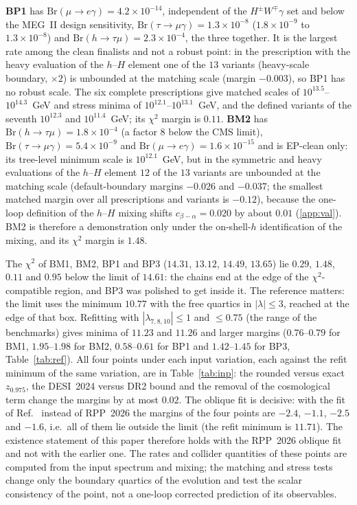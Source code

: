 \documentclass[twocolumn,epjc3]{svjour3}
\newcommand{\Br}{\mathrm{Br}}
\begin{document}
\textbf{BP1} has $\Br(\mu\to e\gamma)=4.2\times10^{-14}$, independent of the $H^\pm W^\mp\gamma$ set and below the MEG~II design sensitivity, $\Br(\tau\to\mu\gamma)=1.3\times10^{-8}$ ($1.8\times10^{-9}$ to $1.3\times10^{-8}$) and $\Br(h\to\tau\mu)=2.3\times10^{-4}$, the three together. It is the largest rate among the clean finalists and not a robust point: in the prescription with the heavy evaluation of the $h$--$H$ element one of the $13$ variants (heavy-scale boundary, $\times2$) is unbounded at the matching scale (margin $-0.003$), so BP1 has no robust scale. The six complete prescriptions give matched scales of $10^{13.5}$--$10^{14.3}$~GeV and stress minima of $10^{12.1}$--$10^{13.1}$~GeV, and the defined variants of the seventh $10^{12.3}$ and $10^{11.4}$~GeV; its $\chi^2$ margin is $0.11$. \textbf{BM2} has $\Br(h\to\tau\mu)=1.8\times10^{-4}$ (a factor $8$ below the CMS limit), $\Br(\tau\to\mu\gamma)=5.4\times10^{-9}$ and $\Br(\mu\to e\gamma)=1.6\times10^{-15}$ and is EP-clean only: its tree-level minimum scale is $10^{12.1}$~GeV, but in the symmetric and heavy evaluations of the $h$--$H$ element $12$ of the $13$ variants are unbounded at the matching scale (default-boundary margins $-0.026$ and $-0.037$; the smallest matched margin over all prescriptions and variants is $-0.12$), because the one-loop definition of the $h$--$H$ mixing shifts $c_{\beta-\alpha}=0.020$ by about $0.01$ (\ref{app:val}). BM2 is therefore a demonstration only under the on-shell-$h$ identification of the mixing, and its $\chi^2$ margin is $1.48$.

The $\chi^2$ of BM1, BM2, BP1 and BP3 ($14.31$, $13.12$, $14.49$, $13.65$) lie $0.29$, $1.48$, $0.11$ and $0.95$ below the limit of $14.61$: the chains end at the edge of the $\chi^2$-compatible region, and BP3 was polished to get inside it. The reference matters: the limit uses the minimum $10.77$ with the free quartics in $|\lambda|\le3$, reached at the edge of that box. Refitting with $|\lambda_{7,8,10}|\le1$ and $\le0.75$ (the range of the benchmarks) gives minima of $11.23$ and $11.26$ and larger margins ($0.76$--$0.79$ for BM1, $1.95$--$1.98$ for BM2, $0.58$--$0.61$ for BP1 and $1.42$--$1.45$ for BP3, Table~\ref{tab:ref}). All four points under each input variation, each against the refit minimum of the same variation, are in Table~\ref{tab:inp}: the rounded versus exact $z_{0.975}$, the DESI~2024 versus DR2 bound and the removal of the cosmological term change the margins by at most $0.02$. The oblique fit is decisive: with the fit of Ref.~\cite{HerreroGarcia:2017xdq} instead of RPP~2026 the margins of the four points are $-2.4$, $-1.1$, $-2.5$ and $-1.6$, i.e.\ all of them lie outside the limit (the refit minimum is $11.71$). The existence statement of this paper therefore holds with the RPP~2026 oblique fit and not with the earlier one. The rates and collider quantities of these points are computed from the input spectrum and mixing; the matching and stress tests change only the boundary quartics of the evolution and test the scalar consistency of the point, not a one-loop corrected prediction of its observables.
\end{document}

